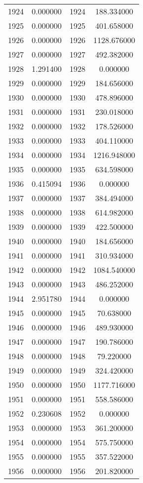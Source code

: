 \documentclass[12pt]{article}
\begin{document}
\begin{longtable}{@{}cccc@{}}
1924 & 0.000000 & 1924 & 188.334000 \\
1925 & 0.000000 & 1925 & 401.658000 \\
1926 & 0.000000 & 1926 & 1128.676000 \\
1927 & 0.000000 & 1927 & 492.382000 \\
1928 & 1.291400 & 1928 & 0.000000 \\
1929 & 0.000000 & 1929 & 184.656000 \\
1930 & 0.000000 & 1930 & 478.896000 \\
1931 & 0.000000 & 1931 & 230.018000 \\
1932 & 0.000000 & 1932 & 178.526000 \\
1933 & 0.000000 & 1933 & 404.110000 \\
1934 & 0.000000 & 1934 & 1216.948000 \\
1935 & 0.000000 & 1935 & 634.598000 \\
1936 & 0.415094 & 1936 & 0.000000 \\
1937 & 0.000000 & 1937 & 384.494000 \\
1938 & 0.000000 & 1938 & 614.982000 \\
1939 & 0.000000 & 1939 & 422.500000 \\
1940 & 0.000000 & 1940 & 184.656000 \\
1941 & 0.000000 & 1941 & 310.934000 \\
1942 & 0.000000 & 1942 & 1084.540000 \\
1943 & 0.000000 & 1943 & 486.252000 \\
1944 & 2.951780 & 1944 & 0.000000 \\
1945 & 0.000000 & 1945 & 70.638000 \\
1946 & 0.000000 & 1946 & 489.930000 \\
1947 & 0.000000 & 1947 & 190.786000 \\
1948 & 0.000000 & 1948 & 79.220000 \\
1949 & 0.000000 & 1949 & 324.420000 \\
1950 & 0.000000 & 1950 & 1177.716000 \\
1951 & 0.000000 & 1951 & 558.586000 \\
1952 & 0.230608 & 1952 & 0.000000 \\
1953 & 0.000000 & 1953 & 361.200000 \\
1954 & 0.000000 & 1954 & 575.750000 \\
1955 & 0.000000 & 1955 & 357.522000 \\
1956 & 0.000000 & 1956 & 201.820000 \\

\end{longtable}
\end{document}
